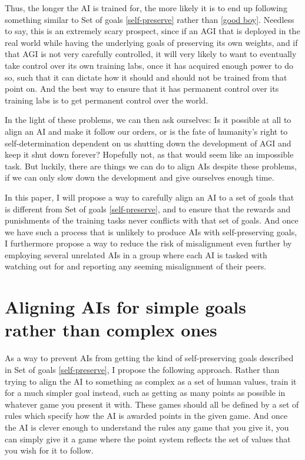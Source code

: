 \documentclass{article}
\begin{document}
Thus, the longer the AI is trained for, the more likely it is to end up following something similar to Set of goals \ref{self-preserve} rather than \ref{good boy}. Needless to say, this is an extremely scary prospect, since if an AGI that is deployed in the real world while having the underlying goals of preserving its own weights, and if that AGI is not very carefully controlled, it will very likely to want to eventually take control over its own training labs, once it has acquired enough power to do so, such that it can dictate how it should and should not be trained from that point on. And the best way to ensure that it has permanent control over its training labs is to get permanent control over the world.

In the light of these problems, we can then ask ourselves: Is it possible at all to align an AI and make it follow our orders, or is the fate of humanity's right to self-determination dependent on us shutting down the development of AGI and keep it shut down forever? Hopefully not, as that would seem like an impossible task. But luckily, there are things we can do to align AIs despite these problems, if we can only slow down the development and give ourselves enough time.

In this paper, I will propose a way to carefully align an AI to a set of goals that is different from Set of goals \ref{self-preserve}, and to ensure that the rewards and punishments of the training tasks never conflicts with that set of goals. And once we have such a process that is unlikely to produce AIs with self-preserving goals, I furthermore propose a way to reduce the risk of misalignment even further by employing several unrelated AIs in a group where each AI is tasked with watching out for and reporting any seeming misalignment of their peers.



\section{Aligning AIs for simple goals rather than complex ones}

As a way to prevent AIs from getting the kind of self-preserving goals described in Set of goals \ref{self-preserve}, I propose the following approach.
Rather than trying to align the AI to something as complex as a set of human values, train it for a much simpler goal instead, such as getting as many points as possible in whatever game you present it with. These games should all be defined by a set of rules which specify how the AI is awarded points in the given game. And once the AI is clever enough to understand the rules any game that you give it, you can simply give it a game where the point system reflects the set of values that you wish for it to follow.
\end{document}

